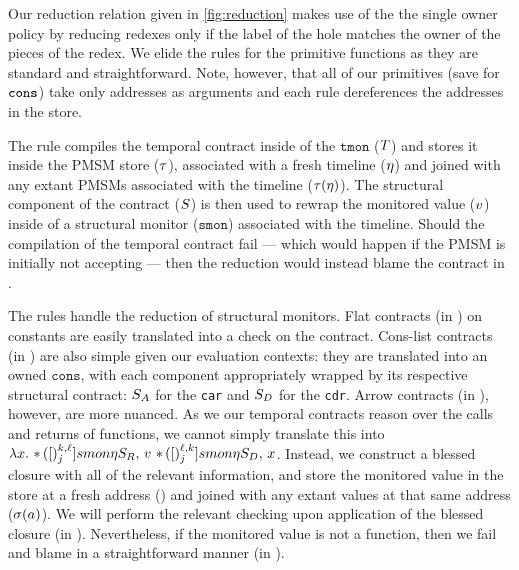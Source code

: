%
Our reduction relation given in \autoref{fig:reduction} makes use of the the single owner policy by reducing redexes only if the label of the hole matches the owner of the pieces of the redex.
%
We elide the rules for the primitive functions as they are standard and straightforward.
%
Note, however, that all of our primitives (save for ${\tt cons}$) take only addresses as arguments and each rule dereferences the addresses in the store.
%

%
The  rule compiles the temporal contract inside of the $\mathtt{tmon}$ ($T$) and stores it inside the PMSM store ($\tau$), associated with a fresh timeline ($\eta$) and joined with any extant PMSMs associated with the timeline ($\tau(\eta)$).
%
The structural component of the contract ($S$) is then used to rewrap the monitored value ($v$) inside of a structural monitor ($\mathtt{smon}$) associated with the timeline.
%
Should the compilation of the temporal contract fail --- which would happen \eg if the PMSM is initially not accepting --- then the reduction would instead blame the contract in .
%

%
The  rules handle the reduction of structural monitors.
%
Flat contracts (in ) on constants are easily translated into a check on the contract.
%
Cons-list contracts (in ) are also simple given our evaluation contexts: they are translated into an owned $\mathtt{cons}$, with each component appropriately wrapped by its respective structural contract: $S_A$ for the \texttt{car} and $S_D$ for the \texttt{cdr}.
%
%
Arrow contracts (in ), however, are more nuanced.
%
As we our temporal contracts reason over the calls and returns of functions, we cannot simply translate this into \eg\ $\lambda x.\  {\tt *}{\,}({[})^{k,\ell}_{j}]{smon}{\eta}{S_R,\,  v\ {\tt *}{\,}({[})^{\ell,k}_{j}]{smon}{\eta}{S_D,\, x} }$.
%
Instead, we construct a blessed closure with all of the relevant information, and store the monitored value in the store at a fresh address (\maddr) and joined with any extant values at that same address ($\sigma(a)$).
%
We will perform the relevant checking upon application of the blessed closure (in ).
%
Nevertheless, if the monitored value is not a function, then we fail and blame in a straightforward manner (in ).
%

